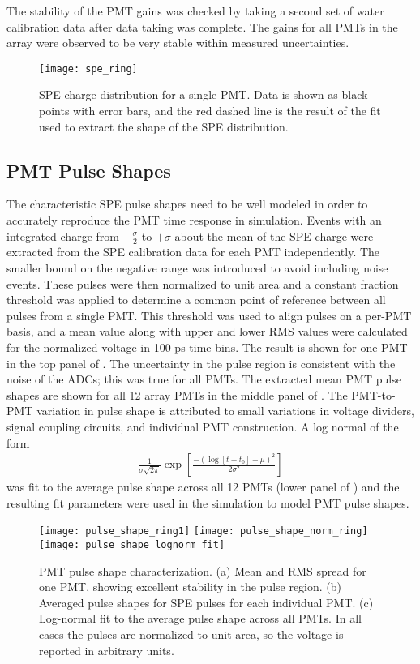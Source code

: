 The stability of the PMT gains was checked by taking a second set of water calibration data after data taking was complete.  
The gains for all PMTs in the array were observed to be very stable within measured uncertainties.

\begin{figure}
\centering
\texttt{[image: spe\_ring]}
\caption{SPE charge distribution for a single PMT. Data is shown as black points with error bars, and the red dashed line is the result of the fit used to extract the shape of the SPE distribution. }
\label{fig:spe_data}
\end{figure}


\subsection{PMT Pulse Shapes}
\label{sec:pmtpulses}
The characteristic SPE pulse shapes need to be well modeled in order to accurately reproduce the PMT time response in simulation. 
Events with an integrated charge from $-\frac{\sigma}{2}$ to $+\sigma$ about the mean of the SPE charge were extracted from the SPE calibration data for each PMT independently. 
The smaller bound on the negative range was introduced to avoid including noise events. 
These pulses were then normalized to unit area and a constant fraction threshold was applied to determine a common point of reference between all pulses from a single PMT.  
This threshold was used to align pulses on a per-PMT basis, and a mean value along with upper and lower RMS values were calculated for the normalized voltage in 100-ps time bins.
The result is shown for one PMT in the top panel of . 
The uncertainty in the pulse region is consistent with the noise of the ADCs; this was true for all PMTs. 
The extracted mean PMT pulse shapes are shown for all 12 array PMTs in the middle panel of . 
The PMT-to-PMT variation in pulse shape is attributed to small variations in voltage dividers, signal coupling circuits, and individual PMT construction. 
A log normal of the form 
\begin{eqnarray}
\frac{1}{\sigma \sqrt{2\pi}}\exp{\left[\frac{-\left(\log[t-t_0]-\mu\right)^2}{2\sigma^2}\right]}
\end{eqnarray}
was fit to the average pulse shape across all 12 PMTs (lower panel of ) and the resulting fit parameters were used in the simulation to model PMT pulse shapes.

\begin{figure}
\centering
\texttt{[image: pulse\_shape\_ring1]}
\texttt{[image: pulse\_shape\_norm\_ring]}
\texttt{[image: pulse\_shape\_lognorm\_fit]}
\caption{PMT pulse shape characterization.   
(a) Mean and RMS spread for one PMT, showing excellent stability in the pulse region.  
(b) Averaged pulse shapes for SPE pulses for each individual PMT. 
(c) Log-normal fit to the average pulse shape across all PMTs. 
In all cases the pulses are normalized to unit area, so the voltage is reported in arbitrary units.}
\label{fig:spe-pulse-shape}
\end{figure}



